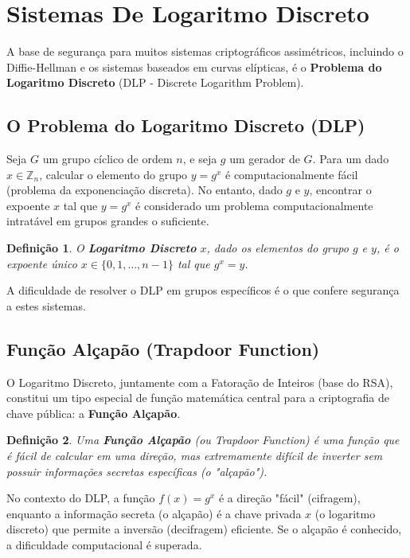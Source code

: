 \documentclass{article}
\theoremstyle{definicao_estilo}
\newtheorem{definicao}{Definição}
\begin{document}
\section{Sistemas De Logaritmo Discreto}
A base de segurança para muitos sistemas criptográficos assimétricos, incluindo o Diffie-Hellman e os sistemas baseados em curvas elípticas, é o \textbf{Problema do Logaritmo Discreto} (DLP - Discrete Logarithm Problem).

\subsection{O Problema do Logaritmo Discreto (DLP)}
Seja $G$ um grupo cíclico de ordem $n$, e seja $g$ um gerador de $G$. Para um dado $x \in \mathbb{Z}_n$, calcular o elemento do grupo $y = g^x$ é computacionalmente fácil (problema da exponenciação discreta). No entanto, dado $g$ e $y$, encontrar o expoente $x$ tal que $y = g^x$ é considerado um problema computacionalmente intratável em grupos grandes o suficiente.

\begin{definicao}
O \textbf{Logaritmo Discreto} $x$, dado os elementos do grupo $g$ e $y$, é o expoente único $x \in \{0, 1, \dots, n-1\}$ tal que $g^x = y$.
\end{definicao}

A dificuldade de resolver o DLP em grupos específicos é o que confere segurança a estes sistemas.

\subsection{Função Alçapão (Trapdoor Function)}
O Logaritmo Discreto, juntamente com a Fatoração de Inteiros (base do RSA), constitui um tipo especial de função matemática central para a criptografia de chave pública: a \textbf{Função Alçapão}.

\begin{definicao}
Uma \textbf{Função Alçapão} (ou \emph{Trapdoor Function}) é uma função que é fácil de calcular em uma direção, mas extremamente difícil de inverter sem possuir informações secretas específicas (o "alçapão").
\end{definicao}

No contexto do DLP, a função $f(x) = g^x$ é a direção "fácil" (cifragem), enquanto a informação secreta (o alçapão) é a chave privada $x$ (o logaritmo discreto) que permite a inversão (decifragem) eficiente. Se o alçapão é conhecido, a dificuldade computacional é superada.
\end{document}
